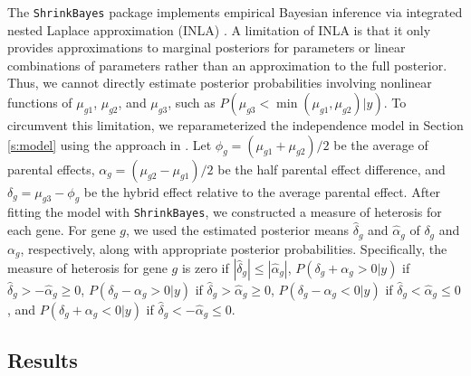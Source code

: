\documentclass[useAMS,usenatbib,referee]{biom}
\newcommand{\ShrinkBayes}{{\tt ShrinkBayes}}
\begin{document}
The \ShrinkBayes{} package implements empirical Bayesian inference via integrated nested Laplace approximation (INLA) \citep{rue2009approximate,van2014shrinkbayes}. A limitation of INLA is that it only provides approximations to marginal posteriors for parameters or linear combinations of parameters rather than an approximation to the full posterior. Thus, we cannot directly estimate posterior probabilities involving nonlinear functions of $\mu_{g1}$, $\mu_{g2}$, and $\mu_{g3}$, such as $P(\mu_{g3} < \min(\mu_{g1},\mu_{g2})|y)$. To circumvent this limitation, we reparameterized the independence model in Section \ref{s:model} using the approach in \cite{ji2014estimation}. 
Let $\phi_g = (\mu_{g1}+\mu_{g2})/2$ be the average of parental effects, $\alpha_g = (\mu_{g2}-\mu_{g1})/2$ be the half parental effect difference, and $\delta_g = \mu_{g3} - \phi_g$ be the hybrid effect relative to the average parental effect. After fitting the model with \ShrinkBayes{}, we constructed a measure of heterosis for each gene. For gene $g$, we used the estimated posterior means $\hat{\delta}_g$ and $\hat{\alpha}_g$ of $\delta_g$ and $\alpha_g$, respectively, along with appropriate posterior probabilities. Specifically, the measure of heterosis for gene $g$ is zero if $|\hat{\delta}_g| \le |\hat{\alpha}_g|$, $P(\delta_g + \alpha_g > 0 |y)$ if $\hat{\delta}_g > -\hat{\alpha}_g \ge 0$, $P(\delta_g - \alpha_g > 0 |y)$ if $\hat{\delta}_g > \hat{\alpha}_g \ge 0$, $P(\delta_g - \alpha_g < 0 |y)$ if $\hat{\delta}_g < \hat{\alpha}_g \le 0$, and $P(\delta_g + \alpha_g < 0 |y)$ if $\hat{\delta}_g < -\hat{\alpha}_g \le 0$.  


\subsection{Results}
\end{document}
